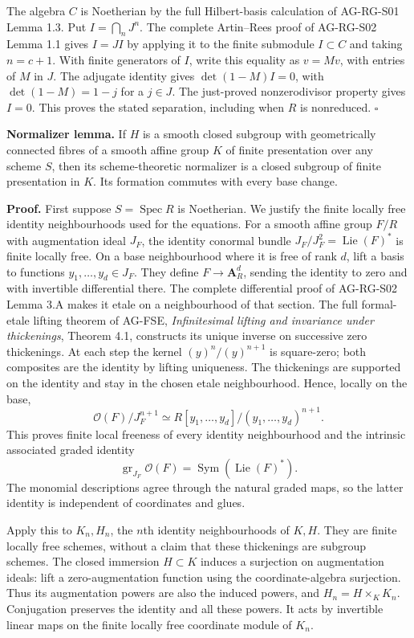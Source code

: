 \documentclass[11pt,a4paper,openany]{report}
\begin{document}
The algebra \(C\) is Noetherian by the full Hilbert-basis calculation of AG-RG-S01 Lemma 1.3. Put \(I=\bigcap_nJ^n\). The complete Artin--Rees proof of AG-RG-S02 Lemma 1.1 gives \(I=JI\) by applying it to the finite submodule \(I\subset C\) and taking \(n=c+1\). With finite generators of \(I\), write this equality as \(v=Mv\), with entries of \(M\) in \(J\). The adjugate identity gives \(\det(1-M)I=0\), with \(\det(1-M)=1-j\) for a \(j\in J\). The just-proved nonzerodivisor property gives \(I=0\). This proves the stated separation, including when \(R\) is nonreduced. \(\square\)

\textbf{Normalizer lemma.} If \(H\) is a smooth closed subgroup with geometrically connected fibres of a smooth affine group \(K\) of finite presentation over any scheme \(S\), then its scheme-theoretic normalizer is a closed subgroup of finite presentation in \(K\). Its formation commutes with every base change.

\textbf{Proof.} First suppose \(S=\operatorname{Spec}R\) is Noetherian. We justify the finite locally free identity neighbourhoods used for the equations. For a smooth affine group \(F/R\) with augmentation ideal \(J_F\), the identity conormal bundle \(J_F/J_F^2=\operatorname{Lie}(F)^*\) is finite locally free. On a base neighbourhood where it is free of rank \(d\), lift a basis to functions \(y_1,\ldots,y_d\in J_F\). They define \(F\to\mathbf A_R^d\), sending the identity to zero and with invertible differential there. The complete differential proof of AG-RG-S02 Lemma 3.A makes it etale on a neighbourhood of that section. The full formal-etale lifting theorem of AG-FSE, \emph{Infinitesimal lifting and invariance under thickenings}, Theorem 4.1, constructs its unique inverse on successive zero thickenings. At each step the kernel \((y)^n/(y)^{n+1}\) is square-zero; both composites are the identity by lifting uniqueness. The thickenings are supported on the identity and stay in the chosen etale neighbourhood. Hence, locally on the base, \[
 \mathcal O(F)/J_F^{n+1}\simeq
 R[y_1,\ldots,y_d]/(y_1,\ldots,y_d)^{n+1}.
\] This proves finite local freeness of every identity neighbourhood and the intrinsic associated graded identity \[
 \operatorname{gr}_{J_F}\mathcal O(F)
       =\operatorname{Sym}(\operatorname{Lie}(F)^*).
\] The monomial descriptions agree through the natural graded maps, so the latter identity is independent of coordinates and glues.

Apply this to \(K_n,H_n\), the \(n\)th identity neighbourhoods of \(K,H\). They are finite locally free schemes, without a claim that these thickenings are subgroup schemes. The closed immersion \(H\subset K\) induces a surjection on augmentation ideals: lift a zero-augmentation function using the coordinate-algebra surjection. Thus its augmentation powers are also the induced powers, and \(H_n=H\times_KK_n\). Conjugation preserves the identity and all these powers. It acts by invertible linear maps on the finite locally free coordinate module of \(K_n\).
\end{document}
